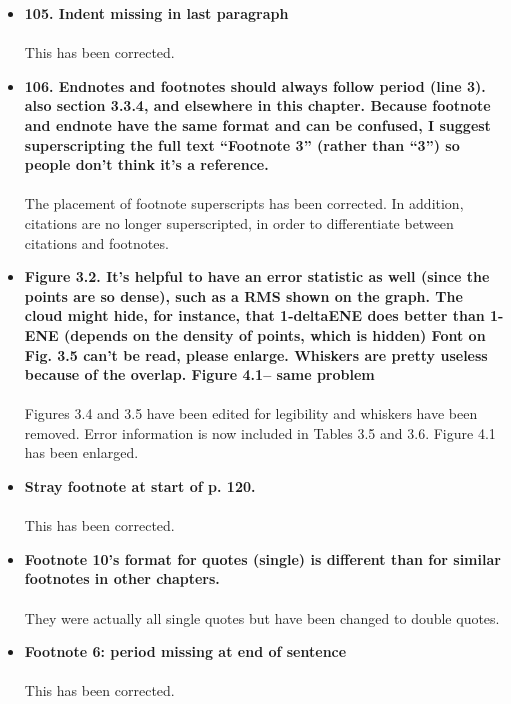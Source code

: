 \documentclass[a4paper,10pt]{article}
\begin{document}
\begin{itemize}
 \item \textbf{105.  Indent missing in last paragraph}\\
 \\
 This has been corrected.
 
 \item \textbf{106.  Endnotes and footnotes should always follow period (line 3). also section 3.3.4, and elsewhere in this chapter.  Because footnote and endnote have the same format and can be confused, I suggest superscripting the full text ``Footnote 3'' (rather than ``3'') so people don't think it's a reference.}\\
 \\
 The placement of footnote superscripts has been corrected.  In addition, citations are no longer superscripted, in order to differentiate between citations and footnotes. 
 
 \item \textbf{Figure 3.2.  It's helpful to have an error statistic as well (since the points are so dense), such as a RMS shown on the graph.  The cloud might hide, for instance, that 1-deltaENE does better than 1-ENE (depends on the density of points, which is hidden) Font on Fig. 3.5 can't be read, please enlarge.  Whiskers are pretty useless because of the overlap.   Figure 4.1-- same problem}\\
 \\
 Figures 3.4 and 3.5 have been edited for legibility and whiskers have been removed.  Error information is now included in Tables 3.5 and 3.6. Figure 4.1 has been enlarged. 
 
 \item \textbf{Stray footnote at start of p. 120.}\\
 \\
 This has been corrected. 
 
 \item \textbf{Footnote 10's format for quotes (single) is different than for similar footnotes in other chapters.}\\
 \\
 They were actually all single quotes but have been changed to double quotes. 
 
 \item \textbf{Footnote 6:  period missing at end of sentence}\\
 \\
 This has been corrected. 
 
\end{itemize}
\end{document}
